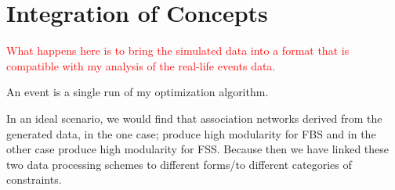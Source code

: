 \section{Integration of Concepts}
\textcolor{red}{What happens here is to bring the simulated data into a format that is compatible with my analysis of the real-life events data.}


{\color{red} 
	An event is a single run of my optimization algorithm.
	
	
	
	In an ideal scenario, we would find that association networks derived from the generated data, in the one case; produce high modularity for FBS and in the other case produce high modularity for FSS. Because then we have linked these two data processing schemes to different forms/to different categories of constraints.
}
